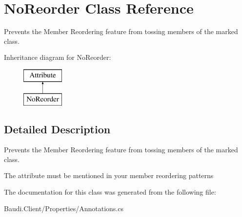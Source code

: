 \hypertarget{class_no_reorder}{}\section{No\+Reorder Class Reference}
\label{class_no_reorder}


Prevents the Member Reordering feature from tossing members of the marked class.  


Inheritance diagram for No\+Reorder\+:\begin{figure}[H]
\begin{center}
\leavevmode
\includegraphics[height=2.000000cm]{class_no_reorder}
\end{center}
\end{figure}


\subsection{Detailed Description}
Prevents the Member Reordering feature from tossing members of the marked class. 

The attribute must be mentioned in your member reordering patterns 

The documentation for this class was generated from the following file\+:\begin{DoxyCompactItemize}
\item 
Baudi.\+Client/\+Properties/Annotations.\+cs\end{DoxyCompactItemize}
